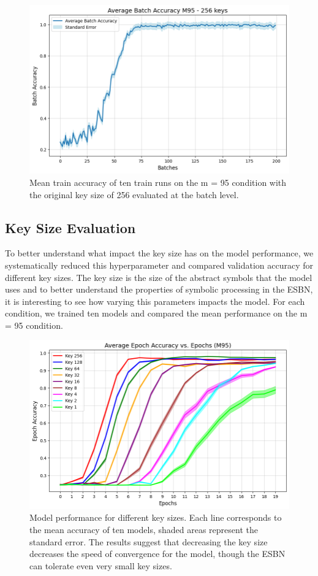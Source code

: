 \begin{figure}
    \centering
    \includegraphics[width=0.6\linewidth]{images/avg_batch_acc_m95_keys256.png}
    \caption{Mean train accuracy of ten train runs on the m = 95 condition with the original key size of 256 evaluated at the batch level.}
    \label{fig:acc_batchlvl_m95}
\end{figure}

\subsection{Key Size Evaluation}
To better understand what impact the key size has on the model performance, we systematically reduced this hyperparameter and compared validation accuracy for different key sizes. The key size is the size of the abstract symbols that the model uses and to better understand the properties of symbolic processing in the ESBN, it is interesting to see how varying this parameters impacts the model. For each condition, we trained ten models and compared the mean performance on the m = 95 condition. \newline

\begin{figure}
    \centering
    \includegraphics[width=0.8\linewidth]{images/epoch_acc_m95.png}
    \caption{Model performance for different key sizes. Each line corresponds to the mean accuracy of ten models, shaded areas represent the standard error. The results suggest that decreasing the key size decreases the speed of convergence for the model, though the ESBN can tolerate even very small key sizes.}
    \label{fig:epoch_acc_m95}
\end{figure}

